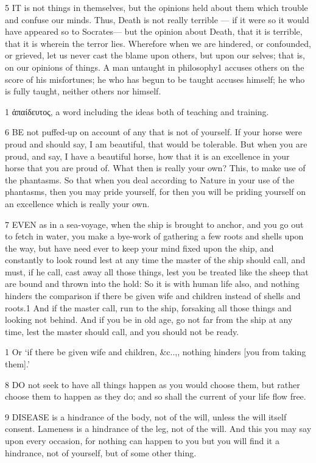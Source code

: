  5    IT is not things in themselves, but the opinions held about them which trouble and confuse our minds. Thus, Death is not really terrible — if it were so it would have appeared so to Socrates— but the opinion about Death, that it is terrible, that it is wherein the terror lies. Wherefore when we are hindered, or confounded, or grieved, let us never cast the blame upon others, but upon our selves; that is, on our opinions of things. A man untaught in philosophy1 accuses others on the score of his misfortunes; he who has begun to be taught accuses himself; he who is fully taught, neither others nor himself.

  1 ἀπαίδευτος, a word including the ideas both of teaching and training.

  6    BE not puffed-up on account of any that is not of yourself.  If your horse were proud and should say, I am beautiful, that would be tolerable.  But when you are proud, and say, I have a beautiful horse, how that it is an excellence in your horse that you are proud of.  What then is really your own?  This, to make use of the phantasms. So that when you deal according to Nature in your use of the phantasms,  then you may pride yourself, for then you will be priding yourself on an excellence which is really your own.

  7    EVEN as in a sea-voyage, when the ship is brought to anchor, and you go out to fetch in water, you make a bye-work of gathering a few roots and shells upon the way, but have need ever to keep your mind fixed upon the ship, and constantly to look round lest at any time the master of the ship should call, and must, if he call, cast away all those things, lest you be treated like the sheep that are bound and thrown into the hold: So it is with human life also, and nothing hinders the comparison if there be given wife and children instead of shells and roots.1 And if the master call, run to the ship, forsaking all those things and looking not behind.  And if you be in old age, go not far from the ship at any time, lest the master should call, and you should not be ready.

  1 Or ‘if there be given wife and children,  &c..,, nothing hinders [you from taking them].’

   8    DO not seek to have all things happen as you would choose them, but rather choose them to happen as they do; and so shall the current of your life flow free.

   9    DISEASE is a hindrance of the body, not of the will, unless the will itself consent. Lameness is a hindrance of the leg, not of the will. And this you may say upon every occasion, for nothing can happen to you but you will find it a hindrance, not of yourself, but of some other thing.

